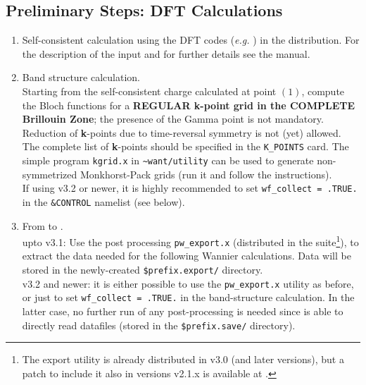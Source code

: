 \subsection{Preliminary Steps: DFT
Calculations}\label{subsection:run_dft}
\renewcommand{\theenumi}{\roman{enumi}}
\renewcommand{\labelenumi}{\theenumi)}
\begin{enumerate}
%
\item Self-consistent calculation using the DFT codes ({\it e.g.} \PWSCF) 
      in the \QUANTUMESPRESSO{} distribution. For the description of the input and for 
      further details see the \PWSCF{} manual.
\item Band structure calculation.\\
      \noindent  Starting from the self-consistent charge
      calculated at point $(1)$, compute the Bloch functions for a
      {\bf REGULAR {\bf k}-point grid in the COMPLETE Brillouin Zone}; the presence of
      the Gamma point is not mandatory.
      Reduction of \textbf{k}-points due to time-reversal symmetry is not (yet) allowed. 
      The complete list of
      \textbf{k}-points should be specified in the {\tt K\_POINTS} card.
      The simple program
      {\tt kgrid.x} in {\tt \~{}want/utility} can be used to generate non-symmetrized
      Monkhorst-Pack grids (run it and follow the instructions).
      \\
      If using \QUANTUMESPRESSO{} v3.2 or newer, it is highly recommended to set
      {\tt wf\_collect = .TRUE.} in the {\tt \&CONTROL} namelist (see below). 
\item From \QUANTUMESPRESSO{} to \WANT.\\
      \noindent \QUANTUMESPRESSO{} upto v3.1: Use the post processing
      {\tt pw\_export.x} (distributed in the \QUANTUMESPRESSO{} suite\footnote{
      The export utility is already distributed in
      \QUANTUMESPRESSO{} v3.0 (and later versions), but a patch to include it also in 
      versions v2.1.x is available at \WANTURL{}.}),
      to extract the data needed for the following Wannier
      calculations. Data will be stored in the
      newly-created \texttt{\$prefix.export/} directory.  \\
     
      \noindent \QUANTUMESPRESSO{} v3.2 and newer: it is either possible to use the
      {\tt pw\_export.x} utility as before, or just to set 
      {\tt wf\_collect = .TRUE.} in the band-structure calculation. In the latter case, 
      no further run of any post-processing is needed since \WANT{} is able to directly read
      \QUANTUMESPRESSO{} datafiles (stored in the \texttt{\$prefix.save/} directory).

\end{enumerate}

